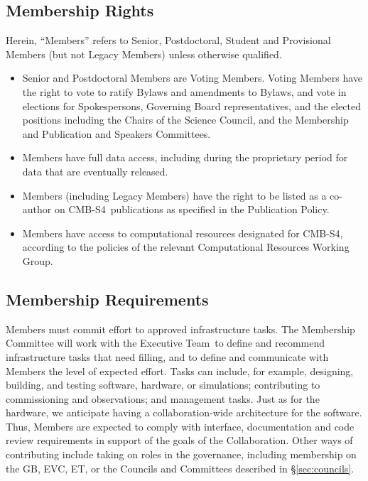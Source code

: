 \documentclass[12pt]{article}
\newcommand{\exec}{{Executive Team}}
\newcommand\collabname{CMB-S4}
\begin{document}
\subsection{Membership Rights}\label{sec:memberrights}

Herein, ``Members'' refers to Senior, Postdoctoral, Student and Provisional Members (but not Legacy Members) unless otherwise qualified.  

\begin{itemize}

\item Senior and Postdoctoral Members are Voting Members.  Voting Members  have the right to vote to ratify Bylaws and amendments to Bylaws, and vote in elections for Spokespersons, Governing Board representatives, and the elected positions including the Chairs of the Science Council, and the Membership and Publication and Speakers Committees.  %

\item Members have full data access, including during the proprietary period for data that are eventually released.

\item Members (including Legacy Members) have the right to be listed as a co-author on \collabname\ publications as specified in the Publication Policy.

\item Members have access to computational resources designated for \collabname, according to the policies of the relevant Computational Resources Working Group.

\end{itemize}

\subsection{Membership Requirements}

 Members must commit effort to approved infrastructure tasks.   
The Membership Committee will work with the \exec\ to define and recommend infrastructure tasks that need filling, and to define and communicate with Members the level of expected effort.
Tasks can include,  for example, designing, building, and testing software, hardware, or simulations; contributing to commissioning and observations; and management tasks. 
Just as for the hardware, we anticipate having a collaboration-wide architecture for the software.  Thus, Members are expected to comply with interface, documentation and code review requirements in support of the goals of the Collaboration.   Other ways of contributing include taking on roles in the governance, including membership on the GB, EVC, ET, or the Councils and Committees described in \S\ref{sec:councils}.
\end{document}
